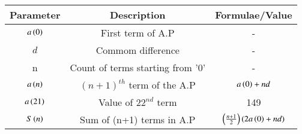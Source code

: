 \renewcommand{\arraystretch}{2}
\begin{tabular}{|c|c|c|}
\hline 
\setlength{\tabcolsep}{1pt}
\textbf{Parameter}  &\textbf{Description} &\textbf{Formulae/Value} \\
\hline
$a\left(0\right)$ & First term of A.P & - \\
\hline
\textbf{$d$} & Commom difference & - \\
\hline
n & Count of terms starting from '0' & - \\
\hline
$a\left(n\right)$ & $(n+1)^{th}$ term of the A.P & $a\left(0\right) + nd$ \\
\hline
$a\left(21\right)$ & Value of $22^{nd}$ term & 149 \\

\hline
$S\left(n\right)$ & Sum of (n+1) terms in A.P & $\left(\frac{n+1}{2}\right) (2a\left(0\right)+nd)$ \\
\hline
\end{tabular}
